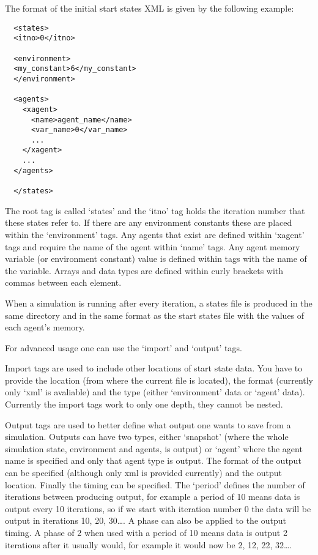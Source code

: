 The format of the initial start states XML is given by the following example:

\begin{verbatim}
  <states>
  <itno>0</itno>
  
  <environment>
  <my_constant>6</my_constant>
  </environment>
  
  <agents>
    <xagent>
      <name>agent_name</name>
      <var_name>0</var_name>
      ...
    </xagent>
    ...
  </agents>

  </states>
\end{verbatim}

The root tag is called `states' and the `itno' tag holds the iteration number
that these states refer to. If there are any environment constants these are
placed within the `environment' tags. Any agents that exist are defined within
`xagent' tags and require the name of the agent within `name' tags. Any agent
memory variable (or environment constant) value is defined within tags with
the name of the variable. Arrays and data types are defined within curly
brackets with commas between each element.

When a simulation is running after every iteration, a states file is produced
in the same directory and in the same format as the start states file with the
values of each agent's memory.

For advanced usage one can use the `import' and `output' tags.

Import tags are used to include other locations of start state data. You have 
to provide the location (from where the current file is located), the format 
(currently only `xml' is avaliable) and the type (either `environment' data 
or `agent' data). Currently the import tags work to only one depth, they 
cannot be nested.

Output tags are used to better define what output one wants to save from a 
simulation. Outputs can have two types, either `snapshot' (where the whole 
simulation state, environment and agents, is output) or `agent' where the 
agent name is specified and only that agent type is output. The format of the 
output can be specified (although only xml is provided currently) and the 
output location. Finally the timing can be specified. The `period' defines 
the number of iterations between producing output, for example a period of 10 
means data is output every 10 iterations, so if we start with iteration number 
0 the data will be output in iterations 10, 20, 30\ldots. A phase can also be
applied to the output timing. A phase of 2 when used with a period of 10 means
data is output 2 iterations after it usually would, for example it would now be
2, 12, 22, 32\ldots. 
